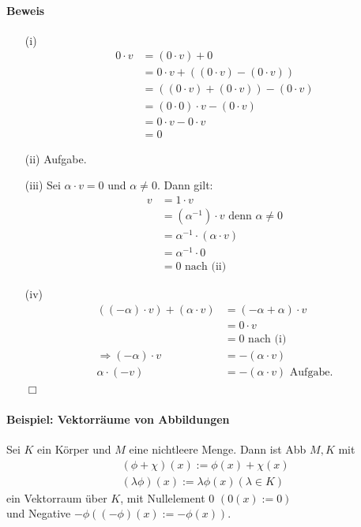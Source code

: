 \documentclass[11pt]{report}
\begin{document}
\paragraph{Beweis}
\begin{itemize}
 \item[(i)] 
\begin{align}
0 \cdot v &= (0\cdot v) + 0 \\
&= 0\cdot v + ((0\cdot v) -(0\cdot v)) \\
&= ((0\cdot v)+ (0\cdot v)) - (0\cdot v)\\
&= (0 \cdot 0) \cdot v - (0 \cdot v) \\
&= 0\cdot v - 0 \cdot v \\
&= 0
\end{align}

 \item[(ii)] Aufgabe.
 \item[(iii)] Sei $\alpha \cdot v= 0$ und $\alpha \neq 0$. Dann gilt:
\begin{align}
 v &= 1\cdot v\\
&= (\alpha^{-1})\cdot v \textrm{ denn } \alpha \neq 0 \\
&= \alpha^{-1}\cdot(\alpha\cdot v)\\
&= \alpha^{-1}\cdot 0 \\
&= 0 \textrm{ nach (ii)}
\end{align}

\item[(iv)]
\begin{align}
((- \alpha)\cdot v) + (\alpha\cdot v) &= (-\alpha+\alpha)\cdot v \\
&= 0\cdot v \\
&= 0 \textrm{ nach (i)} \\
\Rightarrow (-\alpha)\cdot v &= - (\alpha\cdot v) \\
\alpha\cdot(-v) &= -(\alpha\cdot v) \textrm{ Aufgabe.} 
\end{align}
\hspace*{1cm} \hfill $\Box$
\end{itemize}

\paragraph{Beispiel: Vektorräume von Abbildungen}
Sei $K$ ein Körper und $M$ eine nichtleere Menge. Dann ist Abb $M, K$ mit
\begin{align}
 (\phi+\chi)(x) := \phi(x) + \chi(x) \\
 (\lambda \phi)(x) := \lambda \phi(x) (\lambda \in K)
\end{align}
ein Vektorraum über $K$, mit Nullelement 0 $(0(x) := 0)$ \\ und Negative $-\phi((-\phi)(x) := -\phi(x))$.
\end{document}
